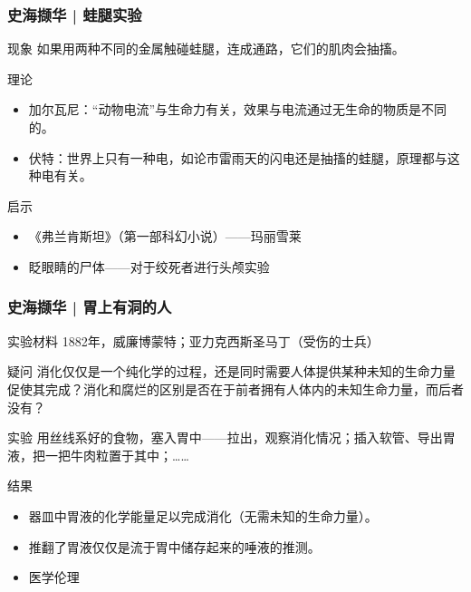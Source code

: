 \begin{frame}
  \frametitle{史海撷华 | 蛙腿实验}
  \begin{block}{现象}
    如果用两种不同的金属触碰蛙腿，连成通路，它们的肌肉会抽搐。
  \end{block}
  \pause
  \begin{block}{理论}
    \begin{itemize}
      \item 加尔瓦尼：“动物电流”与生命力有关，效果与电流通过无生命的物质是不同的。
      \item 伏特：世界上只有一种电，如论市雷雨天的闪电还是抽搐的蛙腿，原理都与这种电有关。
    \end{itemize}
  \end{block}
  \pause
  \begin{block}{启示}
    \begin{itemize}
      \item 《弗兰肯斯坦》（第一部科幻小说）——玛丽\textbullet 雪莱
      \item 眨眼睛的尸体——对于绞死者进行头颅实验
    \end{itemize}
  \end{block}
\end{frame}

\begin{frame}
  \frametitle{史海撷华 | 胃上有洞的人}
  \begin{block}{实验材料}
       1882年，威廉\textbullet 博蒙特；亚力克西斯\textbullet 圣马丁（受伤的士兵）
  \end{block}
  \vspace{-0.5em}
  \pause
  \begin{block}{疑问}
消化仅仅是一个纯化学的过程，还是同时需要人体提供某种未知的生命力量促使其完成？消化和腐烂的区别是否在于前者拥有人体内的未知生命力量，而后者没有？
  \end{block}
  \vspace{-0.5em}
  \pause
  \begin{block}{实验}
      用丝线系好的食物，塞入胃中——拉出，观察消化情况；插入软管、导出胃液，把一把牛肉粒置于其中；……
  \end{block}
  \vspace{-0.5em}
  \pause
  \begin{block}{结果}
    \begin{itemize}
      \item 器皿中胃液的化学能量足以完成消化（无需未知的生命力量）。
      \item 推翻了胃液仅仅是流于胃中储存起来的唾液的推测。
      \item 医学伦理
    \end{itemize}
  \end{block}
\end{frame}

